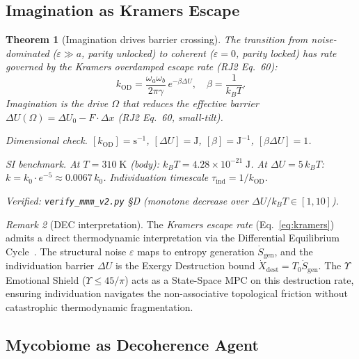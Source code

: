 \documentclass[12pt,oneside]{article}
\theoremstyle{principia}
\newtheorem{theorem}{Theorem}[section]
\theoremstyle{definition}
\theoremstyle{remark}
\newtheorem{remark}[theorem]{Remark}
\begin{document}
\subsection{Imagination as Kramers Escape}

\begin{theorem}[Imagination drives barrier crossing]
\label{thm:kramers}
The transition from noise-dominated ($\varepsilon \gg a$, parity unlocked)
to coherent ($\varepsilon = 0$, parity locked) has rate governed by the
Kramers overdamped escape rate (RJ2 Eq.~60):
\begin{equation}
  k_\mathrm{OD} = \frac{\omega_a\omega_b}{2\pi\gamma}\,e^{-\beta\Delta U},
  \quad \beta = \frac{1}{k_B T}.
  \label{eq:kramers}
\end{equation}
Imagination is the drive $\Omega$ that reduces the effective barrier
$\Delta U(\Omega) = \Delta U_0 - F\cdot\Delta x$ (RJ2 Eq.~60, small-tilt).

\emph{Dimensional check.}
$[k_\mathrm{OD}] = \mathrm{s^{-1}}$, $[\Delta U] = \mathrm{J}$,
$[\beta] = \mathrm{J^{-1}}$, $[\beta\Delta U] = 1$. \checkmark

\emph{SI benchmark.}
At $T = 310\;\mathrm{K}$ (body): $k_BT = 4.28\times10^{-21}\;\mathrm{J}$.
At $\Delta U = 5\,k_BT$: $k = k_0\cdot e^{-5} \approx 0.0067\,k_0$.
Individuation timescale $\tau_\mathrm{ind} = 1/k_\mathrm{OD}$.

Verified: \texttt{verify\_mmm\_v2.py} \S D (monotone decrease over
$\Delta U/k_BT \in [1, 10]$).
\end{theorem}

\begin{remark}[DEC interpretation]
The \emph{Kramers escape rate} (Eq.~\ref{eq:kramers}) admits a direct thermodynamic
interpretation via the Differential Equilibrium Cycle~\cite{lc}. The structural
noise $\varepsilon$ maps to entropy generation $\dot{S}_{\mathrm{gen}}$, and the
individuation barrier $\Delta U$ is the Exergy Destruction bound
$\dot{X}_{\mathrm{dest}} = T_0 \dot{S}_{\mathrm{gen}}$. The $\Upsilon$ Emotional Shield
($\Upsilon \leq 45/\pi$) acts as a State-Space MPC on this destruction rate,
ensuring individuation navigates the non-associative topological friction
without catastrophic thermodynamic fragmentation.
\end{remark}

\subsection{Mycobiome as Decoherence Agent}
\end{document}
